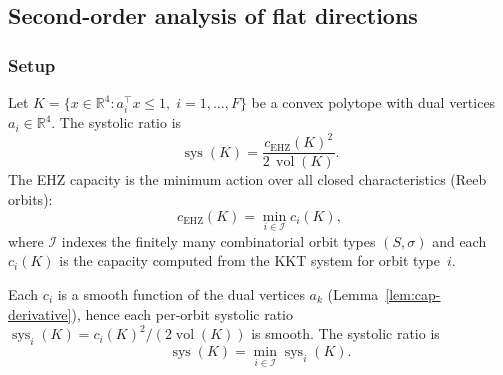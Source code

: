 %
%

\subsection{Second-order analysis of flat directions}
\label{sec:second-order-analysis}


\subsubsection{Setup}

Let $K = \{x \in \mathbb{R}^4 : a_i^\top x \leq 1,\; i = 1,\ldots,F\}$ be
a convex polytope with dual vertices $a_i \in \mathbb{R}^4$.
The systolic ratio is
\[
  \operatorname{sys}(K) = \frac{c_{\mathrm{EHZ}}(K)^2}{2\,\operatorname{vol}(K)}.
\]
The EHZ capacity is the minimum action over all closed characteristics (Reeb orbits):
\[
  c_{\mathrm{EHZ}}(K) = \min_{i \in \mathcal{I}} c_i(K),
\]
where $\mathcal{I}$ indexes the finitely many combinatorial orbit types $(S,\sigma)$
and each $c_i(K)$ is the capacity computed from the KKT system for orbit type~$i$.

Each $c_i$ is a smooth function of the dual vertices $a_k$
(Lemma~\ref{lem:cap-derivative}), hence each per-orbit systolic ratio
$\operatorname{sys}_i(K) = c_i(K)^2 / (2\operatorname{vol}(K))$ is smooth.
The systolic ratio is
\begin{equation}\label{eq:sys-min-envelope}
  \operatorname{sys}(K) = \min_{i \in \mathcal{I}} \operatorname{sys}_i(K).
\end{equation}

